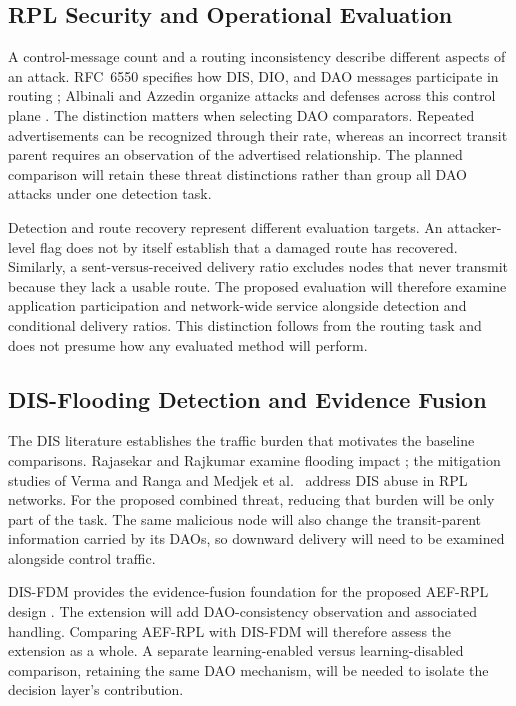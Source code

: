 \documentclass[journal]{IEEEtran}
\begin{document}
\subsection{RPL Security and Operational Evaluation}
A control-message count and a routing inconsistency describe different aspects of an attack. RFC~6550 specifies how DIS, DIO, and DAO messages participate in routing \cite{rfc6550}; Albinali and Azzedin organize attacks and defenses across this control plane \cite{albinali2024}. The distinction matters when selecting DAO comparators. Repeated advertisements can be recognized through their rate, whereas an incorrect transit parent requires an observation of the advertised relationship. The planned comparison will retain these threat distinctions rather than group all DAO attacks under one detection task.

Detection and route recovery represent different evaluation targets. An attacker-level flag does not by itself establish that a damaged route has recovered. Similarly, a sent-versus-received delivery ratio excludes nodes that never transmit because they lack a usable route. The proposed evaluation will therefore examine application participation and network-wide service alongside detection and conditional delivery ratios. This distinction follows from the routing task and does not presume how any evaluated method will perform.

\subsection{DIS-Flooding Detection and Evidence Fusion}
The DIS literature establishes the traffic burden that motivates the baseline comparisons. Rajasekar and Rajkumar examine flooding impact \cite{rajasekar2022}; the mitigation studies of Verma and Ranga \cite{vermaranga2020} and Medjek et al.\ \cite{medjek2021} address DIS abuse in RPL networks. For the proposed combined threat, reducing that burden will be only part of the task. The same malicious node will also change the transit-parent information carried by its DAOs, so downward delivery will need to be examined alongside control traffic.

DIS-FDM provides the evidence-fusion foundation for the proposed AEF-RPL design \cite{prajisha2025}. The extension will add DAO-consistency observation and associated handling. Comparing AEF-RPL with DIS-FDM will therefore assess the extension as a whole. A separate learning-enabled versus learning-disabled comparison, retaining the same DAO mechanism, will be needed to isolate the decision layer's contribution.
\end{document}
